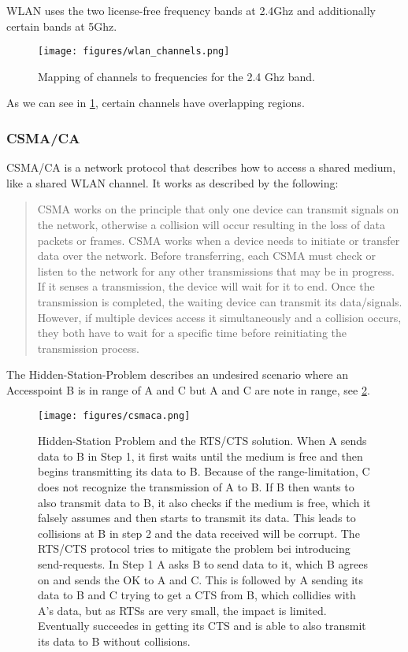     \ac{WLAN} uses the two license-free frequency bands at 2.4Ghz and additionally certain bands at 5Ghz.
    \begin{figure}[th!]
      \centering
      \texttt{[image: figures/wlan\_channels.png]}
      \caption{Mapping of channels to frequencies for the 2.4 Ghz band. \cite{wlan_channels}}
      \label{fig:wlan_channels}
    \end{figure}
    As we can see in \ref{fig:wlan_channels}, certain channels have overlapping regions.
    
      \subsubsection{\ac{CSMA/CA}}
	\ac{CSMA/CA} is a network protocol that describes how to access a shared medium, like a shared WLAN channel.
	It works as described by the following:
	\begin{quotation}
	  CSMA works on the principle that only one device can transmit signals on the network, 
	  otherwise a collision will occur resulting in the loss of data packets or frames. 
	  CSMA works when a device needs to initiate or transfer data over the network. 
	  Before transferring, each CSMA must check or listen to the network for any other transmissions that may be in progress. 
	  If it senses a transmission, the device will wait for it to end. Once the transmission is completed, 
	  the waiting device can transmit its data/signals. However, if multiple devices access it simultaneously and a collision occurs, 
	  they both have to wait for a specific time before reinitiating the transmission process. 
	\end{quotation} \cite{csma_techo}
	
	The Hidden-Station-Problem describes an undesired scenario where an Accesspoint B is in range of A and C but A and C are note in range, see \ref{fig:csmaca}.
	
	\begin{figure}[th!]
	  \centering
	  \texttt{[image: figures/csmaca.png]}
	  \caption{Hidden-Station Problem and the RTS/CTS solution. When A sends data to B in Step 1, 
	    it first waits until the medium is free and then begins transmitting its data to B. 
	    Because of the range-limitation, C does not recognize the transmission of A to B. 
	    If B then wants to also transmit data to B, it also checks if the medium is free, which it falsely assumes
	    and then starts to transmit its data. This leads to collisions at B in step 2 and the data received will be corrupt.
	    The RTS/CTS protocol tries to mitigate the problem bei introducing send-requests. In Step 1 A asks B to send data to it, which B agrees on and sends the OK to
	    A and C. This is followed by A sending its data to B and C trying to get a CTS from B, which collidies with A's data, but as RTSs are very small, the impact
	    is limited. Eventually succeedes in getting its CTS and is able to also transmit its data to B without collisions.}
	  \label{fig:csmaca}
	\end{figure}

